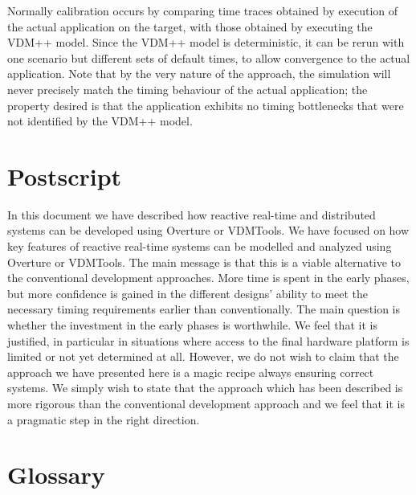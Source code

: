 \documentclass{overturerepchap}
\newcommand{\VDMTools}{VDMTools}
\begin{document}
Normally calibration occurs by comparing time traces obtained by
execution of the actual application on the target, with those obtained
by executing the VDM++ model.  Since the VDM++ model is deterministic,
it can be rerun with one scenario but different sets of default times,
to allow convergence to the actual application. Note that by the very
nature of the approach, the simulation will never precisely match the
timing behaviour of the actual application; the property desired is
that the application exhibits no timing bottlenecks that were not
identified by the VDM++ model.

\chapter{Postscript}\label{chap:postscript}

In this document we have described how reactive real-time and distributed systems can
be developed using Overture or
\VDMTools. We have focused on how key features of
reactive real-time systems can be modelled and analyzed using
Overture or 
\VDMTools. The main message is that this is a viable alternative to
the conventional development approaches. More time is spent in the
early phases, but more confidence is gained in the different designs'
ability to meet the necessary timing requirements earlier than
conventionally. The main question is whether the investment in the
early phases is worthwhile. We feel that it is justified, in
particular in situations where access to the final hardware platform
is limited or not yet determined at all. However, we do not wish to
claim that the approach we have presented here is a magic recipe
always ensuring correct systems. We simply wish to state that the
approach which has been described is more rigorous than the
conventional development approach and we feel that it is a pragmatic
step in the right direction.

\newpage






\newpage
\appendix


\chapter{Glossary}\label{app:glossary}
\end{document}
